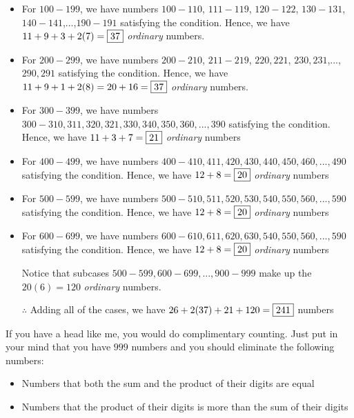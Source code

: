 \documentclass[11pt,paper=letter]{scrartcl}
\begin{document}
\begin{itemize}
    \item For $100-199$, we have numbers $100-110$, $111 - 119$, $120-122$, $130-131$, $140-141$,...,$190-191$ satisfying the condition. Hence, we have $11 + 9 + 3 + 2(7) = \fbox{37}$ \textit{ordinary} numbers.
    
    \item For $200-299$, we have numbers $200-210$, $211 - 219$, $220, 221$, $230,231$,...,$290,291$ satisfying the condition. Hence, we have $11 + 9 + 1 + 2(8) = 20 + 16 = \fbox{37}$ \textit{ordinary} numbers.
    
    \item For $300-399$, we have numbers $300-310, 311, 320, 321, 330, 340, 350, 360,...,390$ satisfying the condition. Hence, we have $11+3+7=\fbox{21}$ \textit{ordinary} numbers
    
    \item For $400-499$, we have numbers $400-410, 411, 420, 430, 440, 450, 460,...,490$ satisfying the condition. Hence, we have $12+8=\fbox{20}$ \textit{ordinary} numbers
    
    \item For $500-599$, we have numbers $500-510, 511, 520, 530, 540, 550, 560,...,590$ satisfying the condition. Hence, we have $12+8=\fbox{20}$ \textit{ordinary} numbers
    
     \item For $600-699$, we have numbers $600-610, 611, 620, 630, 540, 550, 560,...,590$ satisfying the condition. Hence, we have $12+8=\fbox{20}$ \textit{ordinary} numbers
    
    Notice that subcases $500-599,600-699,...,900-999$ make up the $20(6) =120$ \textit{ordinary} numbers. 
    
    $\therefore$ Adding all of the cases, we have $26 + 2(37) + 21 + 120 = \fbox{241}$ numbers
\end{itemize}


If you have a head like me, you would do complimentary counting. Just put in your mind that you have $999$ numbers and you should eliminate the following numbers:

\begin{itemize}
    \item Numbers that both the sum and the product of their digits are equal
    
    \item Numbers that the product of their digits is more than the sum of their digits
\end{itemize}
\end{document}

